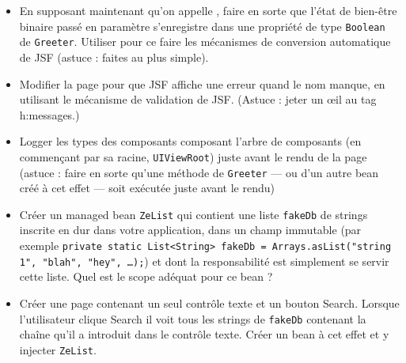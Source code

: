 \documentclass[english, french]{beamer}
\begin{document}
\begin{frame}[allowframebreaks]
\begin{itemize}
		\item En supposant maintenant qu’on appelle , faire en sorte que l’état de bien-être binaire passé en paramètre s’enregistre dans une propriété de type \texttt{Boolean} de \texttt{Greeter}. Utiliser pour ce faire les mécanismes de conversion automatique de JSF {\tiny (astuce : faites au plus simple)}.
		\item Modifier la page pour que JSF affiche une erreur quand le nom manque, en utilisant le mécanisme de validation de JSF. {\tiny (Astuce : jeter un œil au tag h:messages.)}%
		\item Logger les types des composants composant l’arbre de composants (en commençant par sa racine, \texttt{UIViewRoot}) juste avant le rendu de la page {\tiny (astuce : faire en sorte qu’une méthode de \texttt{Greeter} — ou d’un autre bean créé à cet effet — soit exécutée juste avant le rendu)}
		\item Créer un managed bean \texttt{ZeList} qui contient une liste \texttt{fakeDb} de strings inscrite en dur dans votre application, dans un champ immutable (par exemple \texttt{private static List<String> fakeDb = Arrays.asList("string 1", "blah", "hey", …);}) et dont la responsabilité est simplement se servir cette liste. Quel est le scope adéquat pour ce bean ?
		\item Créer une page  contenant un seul contrôle texte et un bouton Search. Lorsque l’utilisateur clique Search il voit tous les strings de \texttt{fakeDb} contenant la chaîne qu’il a introduit dans le contrôle texte. Créer un bean à cet effet et y injecter \texttt{ZeList}.
	\end{itemize}
\end{frame}

\appendix
\end{document}
